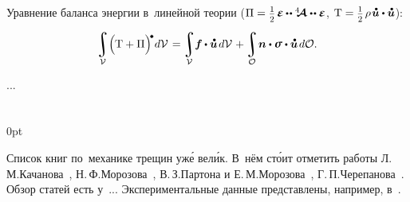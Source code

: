 \begin{otherlanguage}{russian}

Уравнение баланса энергии в~линейной теории (${\Pi = \smash{\smalldisplaystyleonehalf} \hspace{.25ex} \mathboldepsilon \hspace{-0.1ex} \dotdotp \stiffnesstensor \dotdotp \mathboldepsilon}$, ${\mathrm{T} = \smash{\smalldisplaystyleonehalf} \hspace{.25ex} \rho \hspace{.2ex} \mathdotabove{\bm{u}} \dotp \mathdotabove{\bm{u}}}$):

\nopagebreak\vspace{-0.1em}\begin{equation}
\integral\displaylimits_{\mathcal{V}} \hspace{-0.42ex} \left(^{\mathstrut} \hspace{-0.2ex} \mathrm{T} + \Pi \right)^{\hspace{-0.12em}\tikz[baseline=-0.2ex] \draw[black, fill=black] (0,0) circle (.28ex);} \hspace{-0.25ex} d\mathcal{V} \hspace{.2ex}
= \hspace{-0.1ex}
\integral\displaylimits_{\mathcal{V}} \hspace{-0.5ex} \bm{f} \hspace{-0.1ex} \dotp \mathdotabove{\bm{u}} \hspace{.25ex} d\mathcal{V} \hspace{.16ex}
+ \hspace{-0.1ex}
\integral\displaylimits_{\mathcal{O}} \hspace{-0.32ex} \bm{n} \dotp \linearstress \dotp \mathdotabove{\bm{u}} \hspace{.25ex} d\mathcal{O} .
\end{equation}

...



\end{otherlanguage}

\section*{\small \wordforbibliography}

\begin{changemargin}{\parindent}{0pt}
\fontsize{10}{12}\selectfont

\begin{otherlanguage}{russian}

Список книг по~механике трещин уж\'{е} вел\'{и}к. В~нём ст\'{о}ит отметить работы Л.\,М.\;Качанова~\cite{kachanov-fracturemechanics}, Н.\,Ф.\;Морозова~\cite{morozov-fractures}, В.\,З.\;Партона и Е.\,М.\;Морозова~\cite{parton.morozov-destructionofelastoplastic}, Г.\,П.\;Черепанова~\cite{cherepanov-fragilefracture}. Обзор статей есть у~... Экспериментальные данные представлены, например, в~\cite{kerstein.klyushnikov.lomakin.shesterikov-experimentalfracturemechanics}.

\end{otherlanguage}

\end{changemargin}
